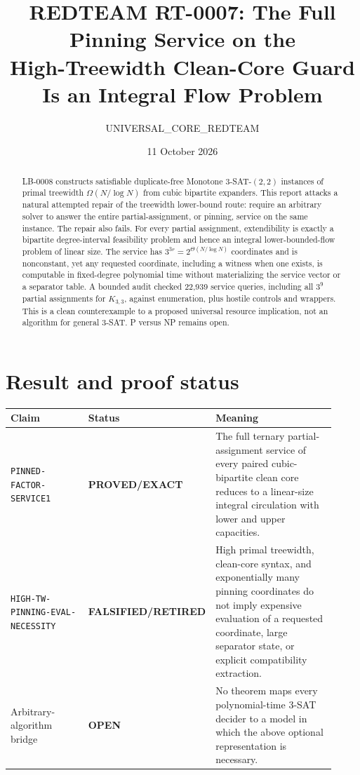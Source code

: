 \documentclass[11pt]{article}
\title{REDTEAM RT-0007: The Full Pinning Service on the\\
High-Treewidth Clean-Core Guard Is an Integral Flow Problem}
\author{UNIVERSAL\_CORE\_REDTEAM}
\date{11 October 2026}
\newcommand{\Status}[1]{\textbf{#1}}
\newcommand{\OPEN}{\Status{OPEN}}
\newcommand{\EXACT}{\Status{PROVED/EXACT}}
\newcommand{\RETIRED}{\Status{FALSIFIED/RETIRED}}
\begin{document}
\maketitle

\begin{abstract}
LB-0008 constructs satisfiable duplicate-free Monotone \(3\)-SAT-\((2,2)\)
instances of primal treewidth \(\Omega(N/\log N)\) from cubic bipartite
expanders. This report attacks a natural attempted repair of the treewidth
lower-bound route: require an arbitrary solver to answer the entire
partial-assignment, or pinning, service on the same instance. The repair also
fails. For every partial assignment, extendibility is exactly a bipartite
degree-interval feasibility problem and hence an integral lower-bounded-flow
problem of linear size. The service has \(3^{3r}=2^{\Theta(N/\log N)}\)
coordinates and is nonconstant, yet any requested coordinate, including a
witness when one exists, is computable in fixed-degree polynomial time without
materializing the service vector or a separator table. A bounded audit checked
22,939 service queries, including all \(3^9\) partial assignments for
\(K_{3,3}\), against enumeration, plus hostile controls and wrappers. This is
a clean counterexample to a proposed universal resource implication, not an
algorithm for general \(3\)-SAT. P versus NP remains open.
\end{abstract}

\section{Result and proof status}

\begin{center}
\begin{tabular}{p{0.29\linewidth}p{0.17\linewidth}p{0.46\linewidth}}
\toprule
Claim & Status & Meaning\\
\midrule
\texttt{PINNED-FACTOR-SERVICE1} & \EXACT &
The full ternary partial-assignment service of every paired cubic-bipartite
clean core reduces to a linear-size integral circulation with lower and upper
capacities.\\
\texttt{HIGH-TW-PINNING-EVAL-NECESSITY} & \RETIRED &
High primal treewidth, clean-core syntax, and exponentially many pinning
coordinates do not imply expensive evaluation of a requested coordinate,
large separator state, or explicit compatibility extraction.\\
Arbitrary-algorithm bridge & \OPEN &
No theorem maps every polynomial-time \(3\)-SAT decider to a model in which
the above optional representation is necessary.\\
\bottomrule
\end{tabular}
\end{center}
\end{document}
